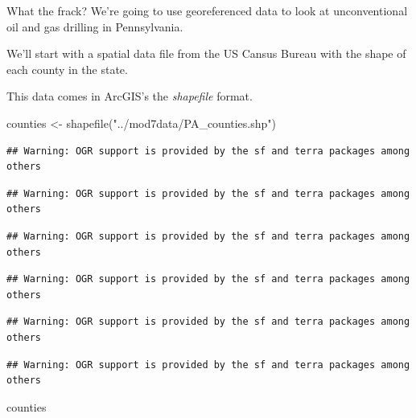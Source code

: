 \documentclass[
  ignorenonframetext,
]{beamer}
\newenvironment{Shaded}{\begin{snugshade}}{\end{snugshade}}
\newcommand{\FunctionTok}[1]{\textcolor[rgb]{0.00,0.00,0.00}{#1}}
\newcommand{\NormalTok}[1]{#1}
\newcommand{\OtherTok}[1]{\textcolor[rgb]{0.56,0.35,0.01}{#1}}
\newcommand{\StringTok}[1]{\textcolor[rgb]{0.31,0.60,0.02}{#1}}
\begin{document}
\begin{frame}[fragile]{What the frack?}
\protect\hypertarget{what-the-frack}{}
We're going to use georeferenced data to look at unconventional oil and
gas drilling in Pennsylvania.

We'll start with a spatial data file from the US Cansus Bureau with the
shape of each county in the state.

This data comes in ArcGIS's the \emph{shapefile} format.

\tiny

\begin{Shaded}
\begin{Highlighting}[]
\NormalTok{counties }\OtherTok{\textless{}{-}} \FunctionTok{shapefile}\NormalTok{(}\StringTok{"../mod7data/PA\_counties.shp"}\NormalTok{)}
\end{Highlighting}
\end{Shaded}

\begin{verbatim}
## Warning: OGR support is provided by the sf and terra packages among others
\end{verbatim}

\begin{verbatim}
## Warning: OGR support is provided by the sf and terra packages among others
\end{verbatim}

\begin{verbatim}
## Warning: OGR support is provided by the sf and terra packages among others
\end{verbatim}

\begin{verbatim}
## Warning: OGR support is provided by the sf and terra packages among others
\end{verbatim}

\begin{verbatim}
## Warning: OGR support is provided by the sf and terra packages among others
\end{verbatim}

\begin{verbatim}
## Warning: OGR support is provided by the sf and terra packages among others
\end{verbatim}

\begin{Shaded}
\begin{Highlighting}[]
\NormalTok{counties}
\end{Highlighting}
\end{Shaded}


\end{frame}
\end{document}
